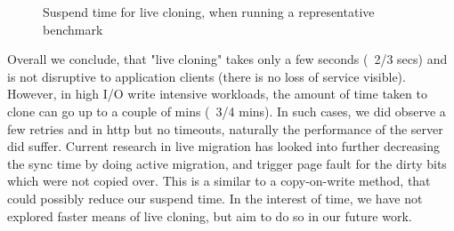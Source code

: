 \begin{figure}[ht]
  \centering
  \captionsetup{justification=centering}
  \caption{Suspend time for live cloning, when running a representative benchmark}
  \label{fig:stats}
\end{figure}


Overall we conclude, that "live cloning" takes only a few seconds (~2/3 secs) and is not disruptive to application clients (there is no loss of service visible). 
However, in high I/O write intensive workloads, the amount of time taken to clone can go up to a couple of mins (~3/4 mins).
In such cases, we did observe a few retries and in http but no timeouts, naturally the performance of the server did suffer. 
Current research in live migration has looked into further decreasing the sync time by doing active migration, and trigger page fault for the dirty bits which were not copied over.
This is a similar to a copy-on-write method, that could possibly reduce our suspend time.
In the interest of time, we have not explored faster means of live cloning, but aim to do so in our future work.

